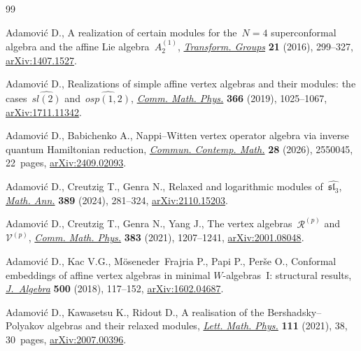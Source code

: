 \documentclass[pdftex]{sigma}
\numberwithin{equation}{section}
\begin{document}
\begin{thebibliography}{99}
\footnotesize\itemsep=0pt

Adamovi\'c D., A realization of certain modules for the~{$N=4$} superconformal
 algebra and the affine {L}ie algebra~{$A_2^{(1)}$},
 \href{https://doi.org/10.1007/s00031-015-9349-2}{\textit{Transform. Groups}}
 \textbf{21} (2016), 299--327,
 \href{http://arxiv.org/abs/1407.1527}{arXiv:1407.1527}.

Adamovi\'c D., Realizations of simple affine vertex algebras and their modules:
 the cases~{$\widehat{sl(2)}$} and~{$\widehat{osp(1,2)}$},
 \href{https://doi.org/10.1007/s00220-019-03328-4}{\textit{Comm. Math. Phys.}}
 \textbf{366} (2019), 1025--1067,
 \href{http://arxiv.org/abs/1711.11342}{arXiv:1711.11342}.

Adamovi\'c D., Babichenko A., Nappi--{W}itten vertex operator algebra via
 inverse quantum {H}amiltonian reduction,
 \href{https://doi.org/10.1142/S0219199725500452}{\textit{Commun. Contemp.
 Math.}} \textbf{28} (2026), 2550045, 22~pages,
 \href{http://arxiv.org/abs/2409.02093}{arXiv:2409.02093}.

Adamovi\'c D., Creutzig T., Genra N., Relaxed and logarithmic modules
 of~{$\widehat{\mathfrak{sl}_3}$},
 \href{https://doi.org/10.1007/s00208-023-02634-6}{\textit{Math. Ann.}}
 \textbf{389} (2024), 281--324,
 \href{http://arxiv.org/abs/2110.15203}{arXiv:2110.15203}.

Adamovi\'c D., Creutzig T., Genra N., Yang J., The vertex algebras~{$\mathcal
 R^{(p)}$} and~{$\mathcal V^{(p)}$},
 \href{https://doi.org/10.1007/s00220-021-03950-1}{\textit{Comm. Math. Phys.}}
 \textbf{383} (2021), 1207--1241,
 \href{http://arxiv.org/abs/2001.08048}{arXiv:2001.08048}.

Adamovi\'c D., Kac V.G., M\"oseneder~Frajria P., Papi P., Per\v{s}e O.,
 Conformal embeddings of affine vertex algebras in minimal {$W$}-algebras~{I}:
 structural results,
 \href{https://doi.org/10.1016/j.jalgebra.2016.12.005}{\textit{J.~Algebra}}
 \textbf{500} (2018), 117--152,
 \href{http://arxiv.org/abs/1602.04687}{arXiv:1602.04687}.

Adamovi\'c D., Kawasetsu K., Ridout D., A realisation of the
 {B}ershadsky--{P}olyakov algebras and their relaxed modules,
 \href{https://doi.org/10.1007/s11005-021-01378-1}{\textit{Lett. Math. Phys.}}
 \textbf{111} (2021), 38, 30~pages,
 \href{http://arxiv.org/abs/2007.00396}{arXiv:2007.00396}.


\end{thebibliography}
\end{document}
